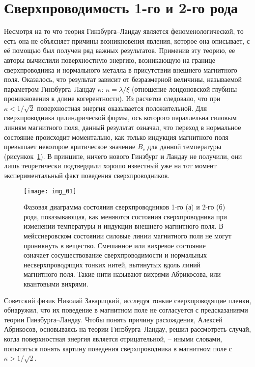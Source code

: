 \section{Сверхпроводимость 1-го и 2-го рода}

Несмотря на то что теория Гинзбурга–Ландау является феноменологической, то 
есть она не объясняет причины возникновения явления, которое она описывает, с 
её помощью был получен ряд важных результатов. Применив эту теорию, ее авторы 
вычислили поверхностную энергию, возникающую на границе сверхпроводника и 
нормального металла в присутствии внешнего магнитного поля. Оказалось, что 
результат зависит от безразмерной величины, называемой параметром 
Гинзбурга–Ландау \( \kappa \): \( \kappa = \lambda/\xi \) (отношение 
лондоновской глубины проникновения к длине когерентности). Из расчетов 
следовало, что при \( \kappa < 1/\sqrt{2} \) поверхностная энергия оказывается 
положительной. Для сверхпроводника цилиндрической формы, ось которого 
параллельна силовым линиям магнитного поля, данный результат означал, что 
переход в нормальное состояние происходит моментально, как только индукция 
магнитного поля превышает некоторое критическое значение \( B_c \) для данной 
температуры (рисункок~\ref{img:01}). В принципе, ничего нового Гинзбург и 
Ландау не получили, они лишь теоретически подтвердили хорошо известный уже на 
тот момент экспериментальный факт поведения сверхпроводников.

\begin{figure}[h!]
    \center
    \texttt{[image: img\_01]}
    \caption{Фазовая диаграмма состояния сверхпроводников 1-го (а) и 
        2-го (б) рода, показывающая, как меняются состояния сверхпроводника 
        при изменении температуры и индукции внешнего магнитного поля. В 
        мейсснеровском состоянии силовые линии магнитного поля не могут 
        проникнуть в вещество. Смешанное или вихревое состояние означает 
        сосуществование сверхпроводимости и нормальных несверхпроводящих 
        тонких нитей, вытянутых вдоль линий магнитного поля. Такие нити 
        называют вихрями Абрикосова, или квантовыми вихрями.}
    \label{img:01}
\end{figure}

Советский физик Николай Заварицкий, исследуя тонкие сверхпроводящие пленки, 
обнаружил, что их поведение в магнитном поле не согласуется с предсказаниями 
теории Гинзбурга–Ландау. Чтобы понять причину расхождения, Алексей Абрикосов, 
основываясь на теории Гинзбурга–Ландау, решил рассмотреть случай, когда 
поверхностная энергия является отрицательной, -- иными словами, попытаться 
понять картину поведения сверхпроводника в магнитном поле с 
\( \kappa > 1/\sqrt{2} \).

